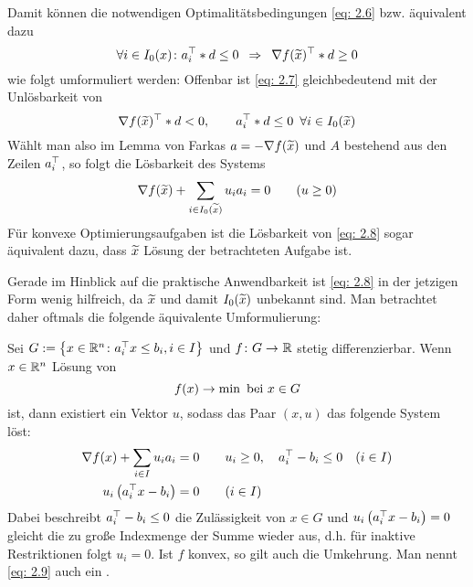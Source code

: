 Damit können die notwendigen Optimalitätsbedingungen \eqref{eq: 2.6} bzw. äquivalent dazu
\begin{equation}
	\forall i \in I_0(x) \colon a_i^{\top} * d \le 0 \enskip \Rightarrow \enskip \nabla f(\widetilde{x})^{\top} * d \ge 0 \label{eq: 2.7}
\end{equation}
wie folgt umformuliert werden: Offenbar ist \eqref{eq: 2.7} gleichbedeutend mit der Unlösbarkeit von 
\begin{equation*}
	\nabla f(\widetilde{x})^{\top} * d < 0, \qquad a_i^{\top} * d \le 0 \enskip \forall i \in I_0(\widetilde{x})
\end{equation*}
Wählt man also im Lemma von Farkas $a = - \nabla f(\widetilde{x})$ und $A$ bestehend aus den Zeilen $a_i^{\top}$, so folgt die Lösbarkeit des Systems
\begin{equation}
	\nabla f(\widetilde{x}) + \sum_{i \in I_0(\widetilde{x})} u_i a_i = 0 \qquad (u \ge 0) \label{eq: 2.8}
\end{equation}
Für konvexe Optimierungsaufgaben ist die Lösbarkeit von \eqref{eq: 2.8} sogar äquivalent dazu, dass $\widetilde{x}$ Lösung der betrachteten Aufgabe ist.

Gerade im Hinblick auf die praktische Anwendbarkeit ist \eqref{eq: 2.8} in der jetzigen Form wenig hilfreich, da $\widetilde{x}$ und damit $I_0(\widetilde{x})$ unbekannt sind. Man betrachtet daher oftmals die folgende äquivalente Umformulierung:

\begin{lemma} %
	\label{lemma: 2.8}
	Sei $G \mathrel{:=} \left\{ x \in \mathbb{R}^n \colon a_i^{\top}x \le b_i , i \in I \right\}$ und $\abb{f}{G}{\R}$ stetig differenzierbar. Wenn $x \in \mathbb{R}^n$ Lösung von
	\begin{equation*}
		f(x) \to \min \text{ bei } x \in  G
	\end{equation*}
	ist, dann existiert ein Vektor $u$, sodass das Paar $(x,u)$ das folgende System löst:
	\begin{align}
		\begin{split}
		\nabla f(x) + \sum_{i \in I} u_i a_i &= 0 \qquad u_i \ge 0 , \quad a_i^{\top} - b_i \le 0 \quad (i \in I) \\
		u_i \left( a_i^{\top}x - b_i \right) &= 0 \qquad (i \in I)
		\end{split} \label{eq: 2.9}
	\end{align}
	Dabei beschreibt $a_i^{\top} - b_i \le 0$ die Zulässigkeit von $x \in G$ und $u_i \left( a_i^{\top}x - b_i \right) = 0$ gleicht die zu große Indexmenge der Summe wieder aus, d.h. für inaktive Restriktionen folgt $u_i = 0$.
	Ist $f$ konvex, so gilt auch die Umkehrung. Man nennt \eqref{eq: 2.9} auch ein .
\end{lemma}

